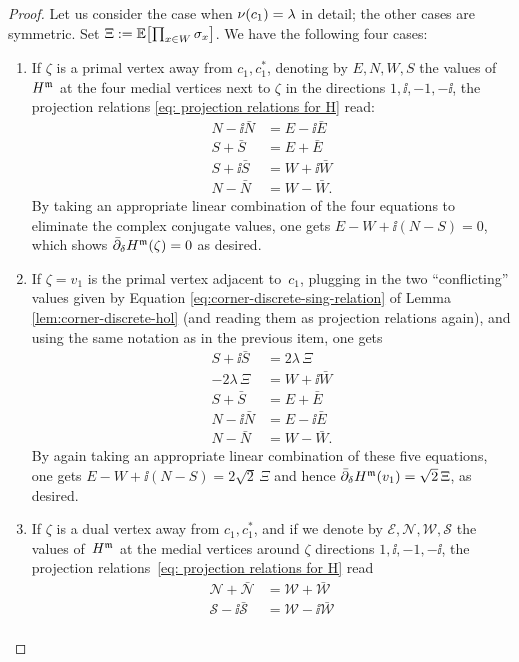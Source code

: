\documentclass[12pt,oneside,english]{amsart}
\numberwithin{equation}{section}
\numberwithin{figure}{section}
\theoremstyle{plain}
\theoremstyle{plain}
\theoremstyle{plain}
\theoremstyle{plain}
\theoremstyle{remark}
\theoremstyle{definition}
\theoremstyle{plain}
\theoremstyle{plain}
\numberwithin{thm}{section}
\begin{document}
\begin{proof}
Let us consider the case when ${\nu}(c_{1}) = \lambda$
in detail; the other cases are symmetric. Set
$\Xi := \mathbb{E} \! \left[ { \prod_{x\in W} {\sigma}_{x} } \right] $.
We have the following four cases: 
\begin{enumerate}
\item If $\zeta$ is a primal vertex away from $c_{1}, c_{1}^{*}$, 
denoting
by $E,N,W,S$ the values of $H^{\mathfrak{m}}$ at the four medial vertices next
to $\zeta$ in the directions $1,\ii ,-1,-\ii$, the projection relations
\eqref{eq: projection relations for H}
read: 
\begin{align*}
N-\ii \bar{N} & =E-\ii \bar{E}\\
S+\bar{S} & =E+\bar{E}\\
S+\ii \bar{S} & =W+\ii \bar{W}\\
N-\bar{N} & =W-\bar{W}.
\end{align*}
By taking an appropriate linear combination of the four equations
to eliminate the complex conjugate values,
one gets $E-W+\ii \left(N-S\right)=0$,
which shows ${{\bar{\partial}}}_{{\delta}} H^{\mathfrak{m}} (\zeta) = 0$ as desired.
\item If $\zeta = v_1$ is the primal vertex adjacent to~$c_{1}$, 
plugging in the two ``conflicting'' values given by Equation 
\eqref{eq:corner-discrete-sing-relation}
of Lemma \ref{lem:corner-discrete-hol} (and reading them as projection
relations again), and using the same notation as in the previous item,
one gets
\begin{align*}
S + \ii \bar{S} & = 2 \lambda \, \Xi \\
- 2 \lambda \, \Xi & = W + \ii \bar{W}\\
S + \bar{S} & = E + \bar{E}\\
N - \ii \bar{N} & = E - \ii \bar{E}\\
N - \bar{N} & = W - \bar{W}.
\end{align*}%
By again taking an appropriate linear combination of these five equations,
one gets
$E - W + \ii \left(N-S\right) = 2 \sqrt{2} \, \Xi$
and hence
${{\bar{\partial}}}_{{\delta}} H^{\mathfrak{m}} (v_1) = \sqrt{2} \, \Xi$,
as desired. 
\item If $\zeta$ is a dual vertex away from $c_{1} ,c_{1}^{*}$, and if
we denote by $\mathcal{E},\mathcal{N},\mathcal{W},\mathcal{S}$ the
values of~$H^{\mathfrak{m}}$ at the medial vertices around
$\zeta$ directions $1,\ii ,-1,-\ii$,
the projection relations~\eqref{eq: projection relations for H} read
\begin{align*}
\mathcal{N}+\bar{\mathcal{N}} & =\mathcal{W}+\bar{\mathcal{W}}\\
\mathcal{S}-\ii \bar{\mathcal{S}} & =\mathcal{W}-\ii \bar{\mathcal{W}}\\

\end{align*}
\end{enumerate}
\end{proof}
\end{document}
